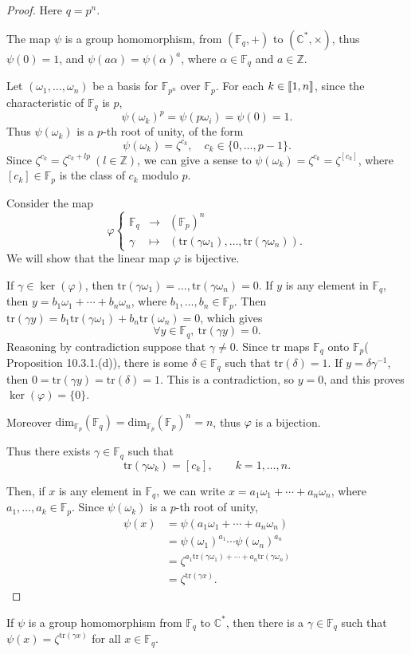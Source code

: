 \documentclass[11pt,a4paper]{article}
\def\gcro{\mbox{[\hspace{-.15em}[}}%
\def\dcro{\mbox{]\hspace{-.15em}]}}
\newcommand{\Z}{\mathbb{Z}}
\newcommand{\C}{\mathbb{C}}
\newcommand{\F}{\mathbb{F}}
\begin{document}
\begin{proof} Here $q = p^n$. 

The map $\psi$ is a group homomorphism, from $(\F_q,+)$ to $(\C^*,\times)$, thus $\psi(0) = 1$, and $\psi(a \alpha) = \psi(\alpha)^a$, where $\alpha \in \F_q$ and $a \in \Z$.

Let $(\omega_1,\ldots,\omega_n)$ be a basis for $\F_{p^n}$ over $\F_p$. For each $k \in \gcro 1,n\dcro$, since the characteristic of $\F_{q}$ is $p$,
$$\psi(\omega_k)^p = \psi( p \omega_i) = \psi(0) = 1.$$
Thus $\psi(\omega_k)$ is a $p$-th root of unity, of the form
$$\psi(\omega_k) = \zeta^{c_k}, \quad c_k \in \{0, \ldots, p-1\}.$$
Since $\zeta^{c_k} = \zeta^{c_k + lp} \ (l\in \Z)$, we can give a sense to $\psi(\omega_k) = \zeta^{c_k} = \zeta^{[c_k]}$, where $[c_k] \in \F_p$ is the class of $c_k$ modulo $p$.

Consider the map
$$
\varphi
\left\{
\begin{array}{ccl}
\F_q & \to & (\F_p)^n\\
\gamma & \mapsto & (\mathrm{tr}(\gamma \omega_1),\ldots, \mathrm{tr}(\gamma \omega_n)).
\end{array}
\right.
$$
We will show that the linear map $\varphi$ is bijective.

If $\gamma \in \ker(\varphi)$, then $\mathrm{tr}(\gamma \omega_1) = \ldots, \mathrm{tr}(\gamma \omega_n) = 0$. If $y$ is any element in $\F_q$, then $y = b_1 \omega_1+\cdots + b_n \omega_n$, where $b_1,\ldots, b_n \in \F_p$. Then  $\mathrm{tr}(\gamma y) = b_1 \mathrm{tr}(\gamma \omega_1) + b_n \mathrm{tr}(\omega_n) = 0$, which gives
$$\forall y \in \F_q,\ \mathrm{tr}(\gamma y ) = 0.$$ 
Reasoning by contradiction suppose that $\gamma \ne 0$. Since $\mathrm{tr}$ maps $\F_q$ onto $\F_p$( Proposition 10.3.1.(d)), there is some $\delta \in \F_q$ such that $\mathrm{tr}(\delta) = 1$. If $y = \delta \gamma^{-1}$, then $0 = \mathrm{tr}(\gamma y) = \mathrm{tr}(\delta) = 1$. This is a contradiction, so $y = 0$, and this proves $\ker(\varphi) = \{0\}$.

Moreover $\mathrm{dim}_{\F_p} (\F_q) = \mathrm{dim}_{\F_p}(\F_p)^n = n$, thus $\varphi$ is a bijection.

Thus there exists $\gamma \in \F_q$ such that $$\mathrm{tr}(\gamma \omega_k) = [c_k],\qquad k=1,\ldots,n.$$

Then, if $x$ is any element in $\F_q$, we can write $x = a_1 \omega_1 + \cdots + a_n \omega_n$, where $a_1,\ldots,a_k \in \F_p$. Since $\psi(\omega_k)$ is a $p$-th root of unity,
\begin{align*}
\psi(x) &= \psi( a_1 \omega_1 + \cdots + a_n \omega_n)\\
&=\psi(\omega_1)^{a_1} \cdots \psi(\omega_n)^{a_n}\\
&=\zeta^{a_1 \mathrm{tr}(\gamma \omega_1) + \cdots + a_n \mathrm{tr}(\gamma\omega_n)}\\
&=\zeta^{\mathrm{tr}(\gamma x)}.
\end{align*}
\end{proof}
If $\psi$ is a group homomorphism from $\F_q$ to $\C^*$, then there is a $\gamma \in \F_q$ such that $\psi(x) = \zeta^{\mathrm{tr}(\gamma x)}$ for all $x \in \F_q$.
\end{document}
